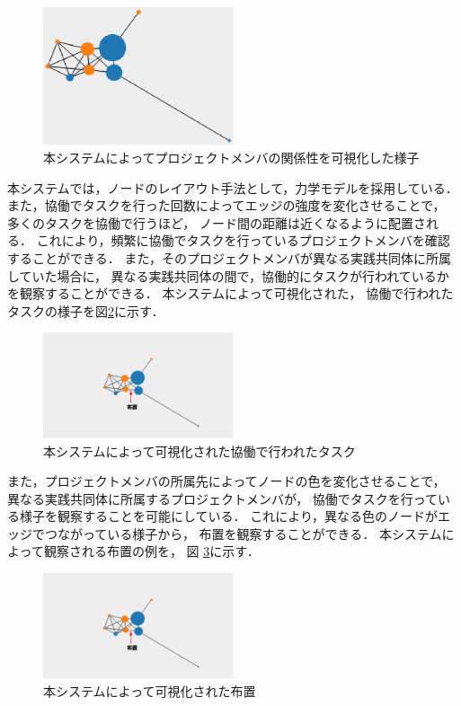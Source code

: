 \documentclass[submit,techrep]{ipsj}
\begin{document}
\begin{figure}[h]
  \centering
  \includegraphics[width=0.5\textwidth]{img/cop-map-graph.eps}
  \caption{本システムによってプロジェクトメンバの関係性を可視化した様子}
  \label{cop-map-graph}
\end{figure}

本システムでは，ノードのレイアウト手法として，力学モデルを採用している．
また，協働でタスクを行った回数によってエッジの強度を変化させることで，
多くのタスクを協働で行うほど，
ノード間の距離は近くなるように配置される．
これにより，頻繁に協働でタスクを行っているプロジェクトメンバを確認することができる．
また，そのプロジェクトメンバが異なる実践共同体に所属していた場合に，
異なる実践共同体の間で，協働的にタスクが行われているかを観察することができる．
本システムによって可視化された，
協働で行われたタスクの様子を図\ref{cop-map-task}に示す．

\begin{figure}[h]
  \centering
  \includegraphics[width=0.5\textwidth]{img/cop-map-task.eps}
  \caption{本システムによって可視化された協働で行われたタスク}
  \label{cop-map-task}
\end{figure}

また，プロジェクトメンバの所属先によってノードの色を変化させることで，
異なる実践共同体に所属するプロジェクトメンバが，
協働でタスクを行っている様子を観察することを可能にしている．
これにより，異なる色のノードがエッジでつながっている様子から，
布置を観察することができる．
本システムによって観察される布置の例を，
図 \ref{cop-map-overlap}に示す．

\begin{figure}[h]
  \centering
  \includegraphics[width=0.5\textwidth]{img/cop-map-overlap.eps}
  \caption{本システムによって可視化された布置}
  \label{cop-map-overlap}
\end{figure}
\end{document}
